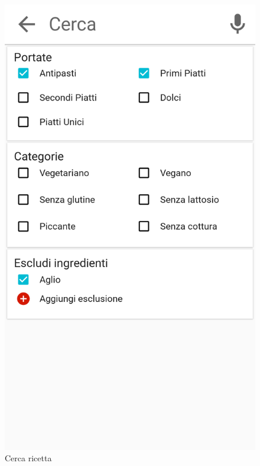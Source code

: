 \begin{figure}[H]
	\begin{minipage}{.49\textwidth}
		\includegraphics[width=\textwidth]{img/wireframe/search_page.png}
		\caption{Cerca ricetta}
		\label{fig:cerca_ricetta}
	\end{minipage}
	\hfill
	\begin{minipage}{.49\textwidth}

\end{minipage}
\end{figure}
